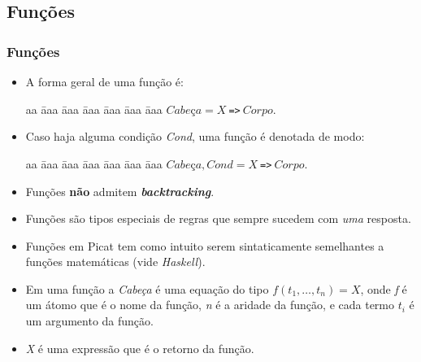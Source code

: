 \subsection{Funções}
\begin{frame}[fragile, c, allowframebreaks=0.75]
	\frametitle{Funções}
    
    \begin{itemize}
        \item A forma geral de uma função é:
        
        \begin{tabbing}
          aa \= aaa \= aaa \= aaa \= aaa \= aaa \= aaa \kill
          \> \> $Cabe$ç$a = X \ $\verb+=>+$\ Corpo$. 
        \end{tabbing}
        
        \item Caso haja alguma condição \emph{Cond}, uma função é denotada de modo:
        
        \begin{tabbing}
          aa \= aaa \= aaa \= aaa \= aaa \= aaa \= aaa \kill
          \> \> $Cabe$ç$a, Cond = X \ $\verb+=>+$\ Corpo$. 
        \end{tabbing}
        
        \item Funções \textbf{não} admitem \textbf{\textit{backtracking}}.
    \end{itemize}
    
    \framebreak
    
    \begin{itemize}
        \item Funções são tipos especiais de regras que sempre sucedem com \emph{uma} 
        resposta.
        
        \item Funções em Picat tem como intuito serem sintaticamente semelhantes a funções matemáticas (vide \emph{Haskell}).
        
        \item Em uma função a \emph{Cabeça} é uma equação do tipo $f(t_1,\ldots,t_n)=X$, onde
        \emph{f} é um átomo que é o nome da função, \emph{n} é a aridade da função, e cada
        termo $t_i$ é um argumento da função.
        
        \item \emph{X} é uma expressão que é o retorno da função.
        
    \end{itemize}
    

\end{frame}
